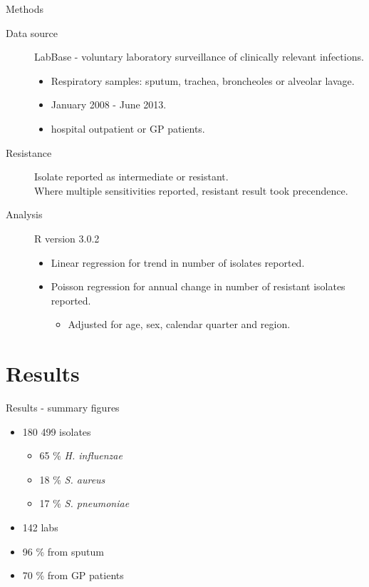\documentclass{beamer}
\begin{document}
\begin{frame}{Methods}
\begin{description}
\item[Data source]LabBase - voluntary laboratory surveillance of clinically relevant infections. 
\begin{itemize}
\item Respiratory samples: sputum, trachea, broncheoles or alveolar lavage.
\item January 2008 - June 2013.
\item hospital outpatient or GP patients.
\end{itemize}
\pause \item[Resistance] Isolate reported as intermediate or resistant. \hfill \\
Where multiple sensitivities reported, resistant result took precendence.
\pause \item[Analysis] R version 3.0.2
\begin{itemize}
\pause \item Linear regression for trend in number of isolates reported.
\pause \item Poisson regression for annual change in number of resistant isolates reported.
\begin{itemize}
\item Adjusted for age, sex, calendar quarter and region.
\end{itemize}
\end{itemize}
\end{description}
\end{frame}
\section{Results}
\begin{frame}{Results - summary figures}
\begin{itemize}
\item 180 499 isolates
\begin{itemize}
\item 65 \% \textit{H. influenzae}
\item 18 \% \textit{S. aureus}
\item 17 \% \textit{S. pneumoniae}
\end{itemize}
\pause \item 142 labs
\pause \item 96 \% from sputum
\pause \item 70 \% from GP patients
\end{itemize}
\end{frame}
\end{document}

